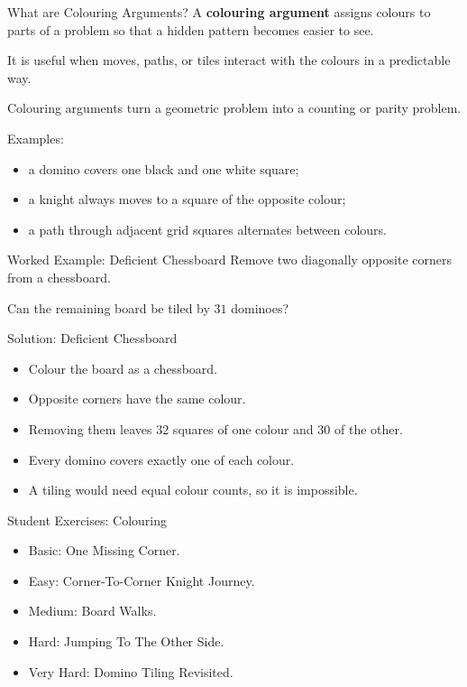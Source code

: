 \documentclass{beamer}
\begin{document}
\begin{frame}{What are Colouring Arguments?}
    \pause
    A \textbf{colouring argument} assigns colours to parts of a
    problem so that a hidden pattern becomes easier to see.

    It is useful when moves, paths, or tiles interact with the
    colours in a predictable way.

    Colouring arguments turn a geometric problem into a counting or
    parity problem.

    Examples:
    \pause
    \begin{itemize}
        \item a domino covers one black and one white square;
        \item a knight always moves to a square of the opposite colour;
        \item a path through adjacent grid squares alternates between colours.
    \end{itemize}

\end{frame}

\begin{frame}{Worked Example: Deficient Chessboard}
    Remove two diagonally opposite corners from a chessboard.

    Can the remaining board be tiled by $31$ dominoes?
\end{frame}

\begin{frame}{Solution: Deficient Chessboard}
    \pause
    \begin{itemize}
        \item Colour the board as a chessboard.
        \item Opposite corners have the same colour.
        \item Removing them leaves $32$ squares of one colour and
            $30$ of the other.
        \item Every domino covers exactly one of each colour.
        \item A tiling would need equal colour counts, so it is impossible.
    \end{itemize}
\end{frame}

\begin{frame}{Student Exercises: Colouring}
    \begin{itemize}
        \item<1-> Basic: One Missing Corner.
        \item<1-> Easy: Corner-To-Corner Knight Journey.
        \item<1-> Medium: Board Walks.
        \item<1-> Hard: Jumping To The Other Side.
        \item<1-> Very Hard: Domino Tiling Revisited.
    \end{itemize}
\end{frame}
\end{document}
